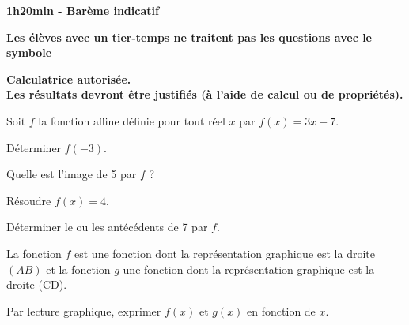 \documentclass[11pt,a4paper]{article}  %
\begin{document}
	\graphicspath{{images/}}
	
	\begin{center}
		
		
	\end{center}

\begin{center}\textbf{1h20min - Barème indicatif}\end{center}
\begin{center}\textbf{Les élèves avec un tier-temps ne traitent pas les questions avec  le symbole }\end{center}
\begin{center}\textbf{Calculatrice autorisée.\\Les résultats devront être justifiés (à l'aide de calcul ou de propriétés).}\end{center}



Soit $f$ la fonction affine définie pour tout réel $x$ par $f(x)=3 x-7$.
\begin{enumMet}
	\item Déterminer $f(-3)$.
	\item Quelle est l'image de 5 par $f$ ?
	\item Résoudre $f(x)=4$.
	\item {} Déterminer le ou les antécédents de 7 par $f$.
\end{enumMet}

La fonction $f$ est une fonction dont la représentation graphique est la droite $(A B)$ et la fonction $g$ une fonction dont la représentation graphique est la droite (CD). 

 Par lecture graphique, exprimer $f(x)$ et $g(x)$ en fonction de $x$.
\end{document}
